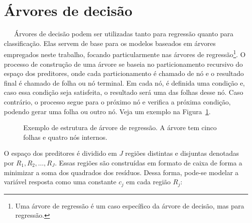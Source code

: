 \documentclass[
  12pt,
  a4paper,
]{scrreprt}
\begin{document}
\section{Árvores de decisão}\label{uxe1rvores-de-decisuxe3o}

~~~Árvores de decisão podem ser utilizadas tanto para regressão quanto
para classificação. Elas servem de base para os modelos baseados em
árvores empregados neste trabalho, focando particularmente nas árvores
de regressão\footnote{Uma árvore de regressão é um caso específico da
  árvore de decisão, mas para regressão.}. O processo de construção de
uma árvore se baseia no particionamento recursivo do espaço dos
preditores, onde cada particionamento é chamado de nó e o resultado
final é chamado de folha ou nó terminal. Em cada nó, é definida uma
condição e, caso essa condição seja satisfeita, o resultado será uma das
folhas desse nó. Caso contrário, o processo segue para o próximo nó e
verifica a próxima condição, podendo gerar uma folha ou outro nó. Veja
um exemplo na Figura~\ref{fig-arvore}.

\begin{figure}


\caption{\label{fig-arvore}Exemplo de estrutura de árvore de regressão.
A árvore tem cinco folhas e quatro nós internos.}

\end{figure}%

\vspace{12pt}

O espaço dos preditores é dividido em \(J\) regiões distintas e
disjuntas denotadas por \(R_1, R_2, \dots, R_J\). Essas regiões são
construídas em formato de caixa de forma a minimizar a soma dos
quadrados dos resíduos. Dessa forma, pode-se modelar a variável resposta
como uma constante \(c_j\) em cada região \(R_j\):
\end{document}
